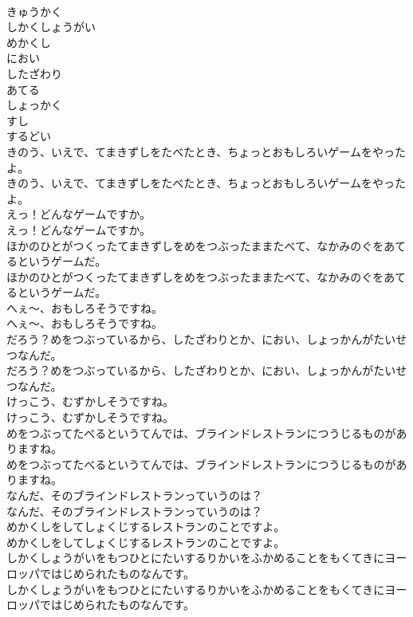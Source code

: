 \documentclass[8pt]{extreport}
\begin{document}
\begin{CJK}{UTF8}{min}
\\	きゅうかく
\\	しかくしょうがい
\\	めかくし
\\	におい
\\	したざわり
\\	あてる
\\	しょっかく
\\	すし
\\	するどい
\\	きのう、いえで、てまきずしをたべたとき、ちょっとおもしろいゲームをやったよ。	
\\	きのう、いえで、てまきずしをたべたとき、ちょっとおもしろいゲームをやったよ。 
\\	えっ！どんなゲームですか。	
\\	えっ！どんなゲームですか。 
\\	ほかのひとがつくったてまきずしをめをつぶったままたべて、なかみのぐをあてるというゲームだ。	
\\	ほかのひとがつくったてまきずしをめをつぶったままたべて、なかみのぐをあてるというゲームだ。 
\\	へぇ～、おもしろそうですね。	
\\	へぇ～、おもしろそうですね。 
\\	だろう？めをつぶっているから、したざわりとか、におい、しょっかんがたいせつなんだ。	
\\	だろう？めをつぶっているから、したざわりとか、におい、しょっかんがたいせつなんだ。 
\\	けっこう、むずかしそうですね。	
\\	けっこう、むずかしそうですね。 
\\	めをつぶってたべるというてんでは、ブラインドレストランにつうじるものがありますね。	
\\	めをつぶってたべるというてんでは、ブラインドレストランにつうじるものがありますね。 
\\	なんだ、そのブラインドレストランっていうのは？	
\\	なんだ、そのブラインドレストランっていうのは？ 
\\	めかくしをしてしょくじするレストランのことですよ。	
\\	めかくしをしてしょくじするレストランのことですよ。 
\\	しかくしょうがいをもつひとにたいするりかいをふかめることをもくてきにヨーロッパではじめられたものなんです。	
\\	しかくしょうがいをもつひとにたいするりかいをふかめることをもくてきにヨーロッパではじめられたものなんです。 

\end{CJK}
\end{document}
